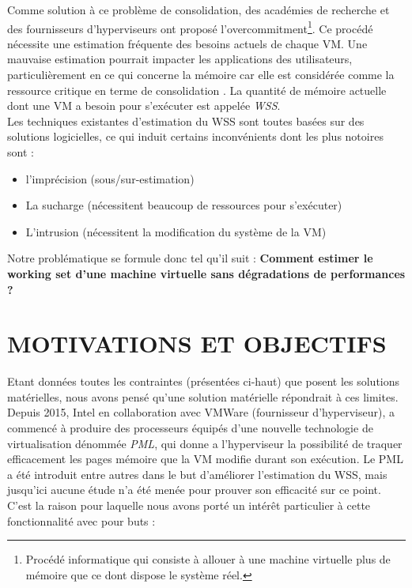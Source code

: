Comme solution à ce problème de consolidation, des académies de recherche et des fournisseurs d'hyperviseurs ont proposé l'overcommitment\footnote{Procédé informatique qui consiste à allouer à une machine virtuelle plus de mémoire que ce dont dispose le système réel.}. Ce procédé nécessite une estimation fréquente des besoins actuels de chaque VM. Une mauvaise estimation pourrait impacter les applications des utilisateurs, particulièrement en ce qui concerne la mémoire car elle est considérée comme la ressource critique en terme de consolidation \cite{datacenter}. La quantité de mémoire actuelle dont une VM a besoin pour s'exécuter est appelée \textit{\ac{WSS}}.\\
Les techniques existantes d'estimation du WSS sont toutes basées sur des solutions logicielles, ce qui induit certains inconvénients dont les plus notoires sont : 

\begin{itemize}[label=, font=\large \color{darkorange}]
    \item l'imprécision (sous/sur-estimation)
    \item La sucharge (nécessitent beaucoup de ressources pour s'exécuter)
    \item L'intrusion (nécessitent la modification du système de la VM)
\end{itemize}

Notre problématique se formule donc tel qu'il suit : \textbf{Comment estimer le working set d'une machine virtuelle sans dégradations de performances ?}

\section*{MOTIVATIONS ET OBJECTIFS}

Etant données toutes les contraintes (présentées ci-haut) que posent les solutions matérielles, nous avons pensé qu'une solution matérielle répondrait à ces limites.\\
Depuis 2015, Intel en collaboration avec VMWare (fournisseur d'hyperviseur), a commencé à produire des processeurs équipés d'une nouvelle technologie de virtualisation dénommée \textit{\ac{PML}}, qui donne a l'hyperviseur la possibilité de traquer efficacement les pages mémoire que la VM modifie durant son exécution. Le PML a été introduit entre autres dans le but d'améliorer l'estimation du WSS, mais jusqu'ici aucune étude n'a été menée pour prouver son efficacité sur ce point. C'est la raison pour laquelle nous avons porté un intérêt particulier à cette fonctionnalité avec pour buts :


